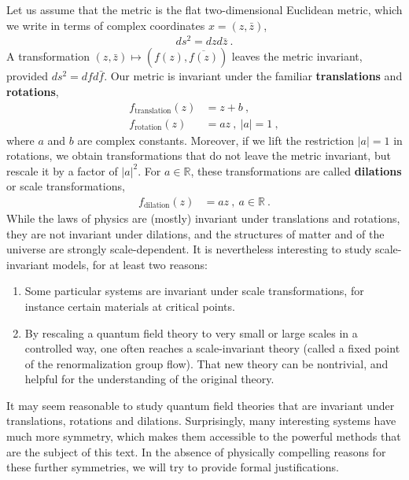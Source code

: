 \documentclass[12pt, a4paper, notitlepage, twoside]{report}
\numberwithin{equation}{section}
\theoremstyle{break}
\begin{document}
Let us assume that the metric is the flat two-dimensional Euclidean metric, which we write in terms of complex coordinates $x=(z,\bar{z})$,
\begin{align}
 ds^2 = dz d\bar{z} \ .
\end{align}
A transformation $(z,\bar{z}) \mapsto (f(z),\overline{f(z)})$ leaves the metric invariant, provided $ds^2 = dfd\bar{f}$.  
Our metric is invariant under the familiar \textbf{\boldmath translations} and \textbf{\boldmath rotations},
\begin{align}
f_\text{translation}(z) &= z+b \ ,
\\ 
f_\text{rotation}(z) &=a z \ , \ |a|=1\ ,
\end{align}
where $a$ and $b$ are complex constants.
Moreover, if we lift the restriction $|a|=1$ in rotations, we obtain transformations that do not leave the metric invariant, but rescale it by a factor of $|a|^2$.
For $a\in{\mathbb{R}}$, these transformations are called \textbf{\boldmath dilations} or scale transformations,
\begin{align}
 f_\text{dilation}(z) &= a z\ , \ a\in {\mathbb{R}}\ .
\end{align}
While the laws of physics are (mostly) invariant under translations and rotations, they are not invariant under dilations, and the structures of matter and of the universe are strongly scale-dependent.
It is nevertheless interesting to study scale-invariant models, for at least two reasons:
\begin{enumerate}
 \item Some particular systems are invariant under scale transformations, for instance certain materials at critical points.
 \item By rescaling a quantum field theory to very small or large scales in a controlled way, one often reaches a scale-invariant theory (called a fixed point of the renormalization group flow).
That new theory can be nontrivial, and helpful for the understanding of the original theory.
\end{enumerate}

It may seem reasonable to study quantum field theories that are invariant under translations, rotations and dilations. 
Surprisingly, many interesting systems have much more symmetry, which makes them accessible to the powerful methods that are the subject of this text.
In the absence of physically compelling reasons for these further symmetries, we will try to provide formal justifications.
\end{document}
